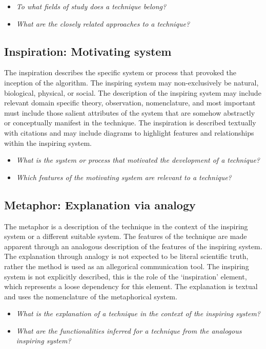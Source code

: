 \documentclass[a4paper, 11pt]{article}
\begin{document}
\begin{itemize}
	\item \emph{To what fields of study does a technique belong?}
	\item \emph{What are the closely related approaches to a technique?}
\end{itemize}

\subsection{Inspiration: Motivating system}
The inspiration describes the specific system or process that provoked the inception of the algorithm. The inspiring system may non-exclusively be natural, biological, physical, or social. The description of the inspiring system may include relevant domain specific theory, observation, nomenclature, and most important must include those salient attributes of the system that are somehow abstractly or conceptually manifest in the technique. The inspiration is described textually with citations and may include diagrams to highlight features and relationships within the inspiring system.

\begin{itemize}
	\item \emph{What is the system or process that motivated the development of a technique?}
	\item \emph{Which features of the motivating system are relevant to a technique?}
\end{itemize}

\subsection{Metaphor: Explanation via analogy}
The metaphor is a description of the technique in the context of the inspiring system or a different suitable system. The features of the technique are made apparent through an analogous description of the features of the inspiring system. The explanation through analogy is not expected to be literal scientific truth, rather the method is used as an allegorical communication tool. The inspiring system is not explicitly described, this is the role of the `inspiration' element, which represents a loose dependency for this element. The explanation is textual and uses the nomenclature of the metaphorical system. 

\begin{itemize}
	\item \emph{What is the explanation of a technique in the context of the inspiring system?}
	\item \emph{What are the functionalities inferred for a technique from the analogous inspiring system?}
\end{itemize}
\end{document}
